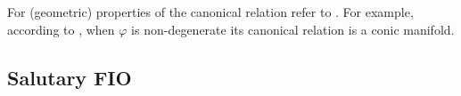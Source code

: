 \documentclass[
	fontsize=11pt, 
	twoside=false, 
	abstract=true, 
	a4paper,
]{scrartcl}
\newcommand{\sem}{\setminus\{0\}}
\newcommand{\RR}{\mathbb{R}}
\newcommand{\DD}{\mathscr{D}}
\newcommand{\dd}{\mathrm{d}}
\newcommand{\abs}[1]{\left\lvert#1\right\rvert}
\newcommand{\ud}[1]{\underline{#1}}
\begin{document}
For (geometric) properties of the canonical relation refer to \cite{zbMATH05817029,FIO1}. For example, according to \cite[Lem.~2.3.2]{zbMATH05817029}, when $\varphi$ is non-degenerate its canonical relation is a conic manifold.


%
%
%

\subsection{Salutary FIO}
\end{document}
